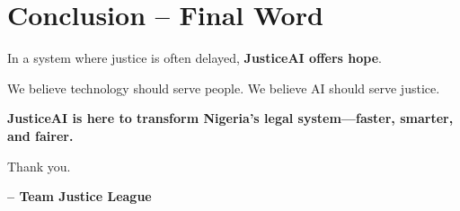\documentclass[12pt]{article}
\begin{document}
\section*{Conclusion – Final Word}

In a system where justice is often delayed, \textbf{JusticeAI offers hope}.

We believe technology should serve people.  
We believe AI should serve justice.

\textbf{JusticeAI is here to transform Nigeria’s legal system—faster, smarter, and fairer.}

Thank you.

\vspace{1em}
\textbf{– Team Justice League}
\end{document}
